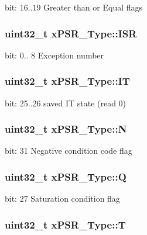 bit\-: 16..19 Greater than or Equal flags \hypertarget{unionx_p_s_r___type_a3e9120dcf1a829fc8d2302b4d0673970}{
\subsubsection[{I\-S\-R}]{\setlength{\rightskip}{0pt plus 5cm}uint32\-\_\-t x\-P\-S\-R\-\_\-\-Type\-::\-I\-S\-R}}\label{unionx_p_s_r___type_a3e9120dcf1a829fc8d2302b4d0673970}
bit\-: 0.. 8 Exception number \hypertarget{unionx_p_s_r___type_a3200966922a194d84425e2807a7f1328}{
\subsubsection[{I\-T}]{\setlength{\rightskip}{0pt plus 5cm}uint32\-\_\-t x\-P\-S\-R\-\_\-\-Type\-::\-I\-T}}\label{unionx_p_s_r___type_a3200966922a194d84425e2807a7f1328}
bit\-: 25..26 saved I\-T state (read 0) \hypertarget{unionx_p_s_r___type_a2db9a52f6d42809627d1a7a607c5dbc5}{
\subsubsection[{N}]{\setlength{\rightskip}{0pt plus 5cm}uint32\-\_\-t x\-P\-S\-R\-\_\-\-Type\-::\-N}}\label{unionx_p_s_r___type_a2db9a52f6d42809627d1a7a607c5dbc5}
bit\-: 31 Negative condition code flag \hypertarget{unionx_p_s_r___type_add7cbd2b0abd8954d62cd7831796ac7c}{
\subsubsection[{Q}]{\setlength{\rightskip}{0pt plus 5cm}uint32\-\_\-t x\-P\-S\-R\-\_\-\-Type\-::\-Q}}\label{unionx_p_s_r___type_add7cbd2b0abd8954d62cd7831796ac7c}
bit\-: 27 Saturation condition flag \hypertarget{unionx_p_s_r___type_a7eed9fe24ae8d354cd76ae1c1110a658}{
\subsubsection[{T}]{\setlength{\rightskip}{0pt plus 5cm}uint32\-\_\-t x\-P\-S\-R\-\_\-\-Type\-::\-T}}\label{unionx_p_s_r___type_a7eed9fe24ae8d354cd76ae1c1110a658}
